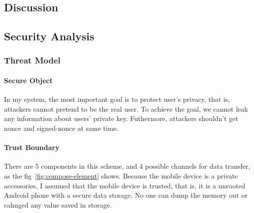 \begin{CJK}{Bg5}{bsmi}


\chapter{Discussion}

\section{Security Analysis}

\subsection{Threat Model}

\subsubsection{Secure Object}

In my system, the most important goal is to protect user's privacy, that is, attackers cannot pretend to be the real user. To achieve the goal, we cannot leak any information about users' private key. Futhermore, attackers shouldn't get nonce and signed-nonce at same time.

\subsubsection{Trust Boundary}

There are 5 components in this scheme, and 4 possible channels for data transfer, as the fig~\ref{fig:compose-element} shows. Because the mobile device is a private accessories, I assumed that the mobile device is trusted, that is, it is a unrooted Android phone with a secure data storage. No one can dump the memory out or cahnged any value saved in storage. 


\end{CJK}
